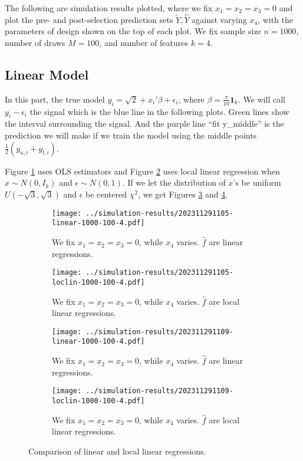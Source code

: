 \documentclass[12pt]{article}
\begin{document}
    The following are simulation results plotted, where we fix \(x_{1} = x_{2} = x_{3} = 0\) and plot the pre- and post-selection prediction sets \(\tilde{Y}, \hat{Y}\) against varying \(x_{4}\), with the parameters of design shown on the top of each plot. We fix sample size \(n = 1000\), number of draws \(M = 100\), and number of features \(k = 4\).  

    \subsection{Linear Model}

    In this part, the true model \(y_{i} = \sqrt{2} + x_{i}'\beta + \epsilon_{i}\), where \(\beta = \frac{\pi}{10} \mathbf{1}_{k}\). We will call \(y_{i} - \epsilon_{i}\) the signal which is the blue line in the following plots. Green lines show the interval surrounding the signal. And the purple line ``fit y\_middle'' is the prediction we will make if we train the model using the middle points \(\frac{1}{2}(y_{u,i} + y_{l,i})\).
    
    Figure \ref{fig:1} uses OLS estimators and Figure \ref{fig:2} uses local linear regression when \(x\sim N(0,I_{k})\) and \(\epsilon\sim N(0,1)\). If we let the distribution of \(x\)'s be uniform \(U( - \sqrt{3}, \sqrt{3})\) and \(\epsilon\) be centered \(\chi^{2}\), we get Figures \ref{fig:3} and \ref{fig:4}.

\begin{figure}[h]
    \centering
    \begin{subfigure}[b]{0.45\textwidth}
        \texttt{[image: ../simulation-results/202311291105-linear-1000-100-4.pdf]}
        \caption{We fix \(x_{1} = x_{2} = x_{3} = 0\), while \(x_{4}\) varies. \(\hat{f}\) are linear regressions.}
        \label{fig:1}
    \end{subfigure}
    \hfill
    \begin{subfigure}[b]{0.45\textwidth}
        \texttt{[image: ../simulation-results/202311291105-loclin-1000-100-4.pdf]}
        \caption{We fix \(x_{1} = x_{2} = x_{3} = 0\), while \(x_{4}\) varies. \(\hat{f}\) are local linear regressions.}
        \label{fig:2}
    \end{subfigure}
    \vfill
    \begin{subfigure}[b]{0.45\textwidth}
        \texttt{[image: ../simulation-results/202311291109-linear-1000-100-4.pdf]}
        \caption{We fix \(x_{1} = x_{2} = x_{3} = 0\), while \(x_{4}\) varies. \(\hat{f}\) are linear regressions.}
        \label{fig:3}
    \end{subfigure}
    \hfill
    \begin{subfigure}[b]{0.45\textwidth}
        \texttt{[image: ../simulation-results/202311291109-loclin-1000-100-4.pdf]}
        \caption{We fix \(x_{1} = x_{2} = x_{3} = 0\), while \(x_{4}\) varies. \(\hat{f}\) are local linear regressions.}
        \label{fig:4}
    \end{subfigure}
    \caption{Comparison of linear and local linear regressions.}
    \label{fig:comparison1}
\end{figure}
\newpage 
\end{document}
